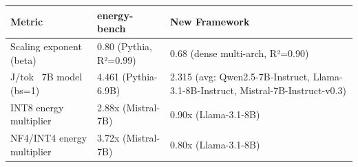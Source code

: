 \begin{tabular}{lll}
\toprule
Metric & energy-bench & New Framework \\
\midrule
Scaling exponent (beta) & 0.80 (Pythia, R²=0.99) & 0.68 (dense multi-arch, R²=0.90) \\
J/tok ~7B model (bs=1) & 4.461 (Pythia-6.9B) & 2.315 (avg: Qwen2.5-7B-Instruct, Llama-3.1-8B-Instruct, Mistral-7B-Instruct-v0.3) \\
INT8 energy multiplier & 2.88x (Mistral-7B) & 0.90x (Llama-3.1-8B) \\
NF4/INT4 energy multiplier & 3.72x (Mistral-7B) & 0.80x (Llama-3.1-8B) \\
\bottomrule
\end{tabular}
